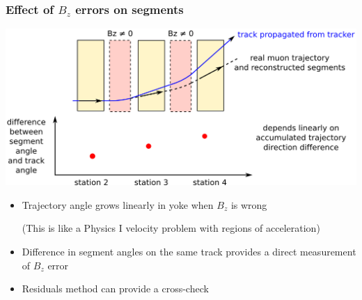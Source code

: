 \documentclass[compress]{beamer}
\begin{document}
\begin{frame}
\frametitle{Effect of $B_z$ errors on segments}

\vfill
\includegraphics[width=\linewidth]{paths2.png}

\vfill
\begin{itemize}
\item Trajectory angle grows linearly in yoke when $B_z$ is wrong

{\scriptsize (This is like a Physics I velocity problem with regions of acceleration)}

\item Difference in segment angles on the same track provides a direct measurement of $B_z$ error
\item Residuals method can provide a cross-check
\end{itemize}
\end{frame}
\end{document}
